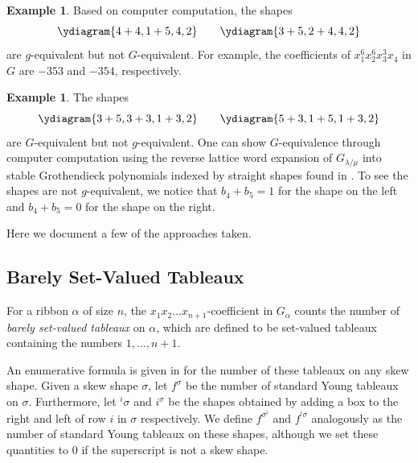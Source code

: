 \documentclass[12pt]{amsart}
\theoremstyle{definition}
\newtheorem{ex}[thm]{Example}
\newcommand{\Becky}[1]{\todo[size=\tiny,inline,color=blue!30]{#1
      \\ \hfill --- B.}}
\newcommand{\Albert}[1]{\todo[size=\tiny,inline,color=green!30]{#1
      \\ \hfill --- A.Z.}}
\newcommand{\Rohil}[1]{\todo[size=\tiny,inline,color=red!30]{#1
	  \\ \hfill --- R.P.}}
\begin{document}
\begin{ex}
Based on computer computation, the shapes \[\ydiagram{4+4,1+5,4,2}\qquad \ydiagram{3+5,2+4,4,2}\] are $g$-equivalent but not $G$-equivalent. For example, the coefficients of $x_1^6 x_2^6 x_3^3 x_4$ in $G$ are $-353$ and $-354$, respectively.
\end{ex}

\begin{ex}\label{ribbon_staircase}
The shapes \[\ydiagram{3+5,3+3,1+3,2} \qquad \ydiagram{5+3,1+5,1+3,2}\] are $G$-equivalent but not $g$-equivalent. One can show $G$-equivalence through computer computation using the reverse lattice word expansion of $G_{\lambda/\mu}$ into stable Grothendieck polynomials indexed by straight shapes found in \cite{buch2002lrrule}. To see the shapes are not $g$-equivalent, we notice that $b_4+b_5 = 1$ for the shape on the left and $b_4+b_5=0$ for the shape on the right.
\end{ex}



\iffalse
Here we document a few of the approaches taken.

\subsection{Barely Set-Valued Tableaux}

For a ribbon $\alpha$ of size $n$, the $x_1x_2 \ldots x_{n+1}$-coefficient in $G_\alpha$ counts the number of \textit{barely set-valued tableaux} on $\alpha$, which are defined to be set-valued tableaux containing the numbers $1, \ldots, n+1$.

An enumerative formula is given in \cite{chan2015bngraph} for the number of these tableaux on any skew shape. Given a skew shape $\sigma$, let $f^{\sigma}$ be the number of standard Young tableaux on $\sigma$. Furthermore, let ${}^i\sigma$ and $i^\sigma$ be the shapes obtained by adding a box to the right and left of row $i$ in $\sigma$ respectively. We define $f^{\sigma^i}$ and $f^{{}^i\sigma}$ analogously as the number of standard Young tableaux on these shapes, although we set these quantities to $0$ if the superscript is not a skew shape.
\end{document}

